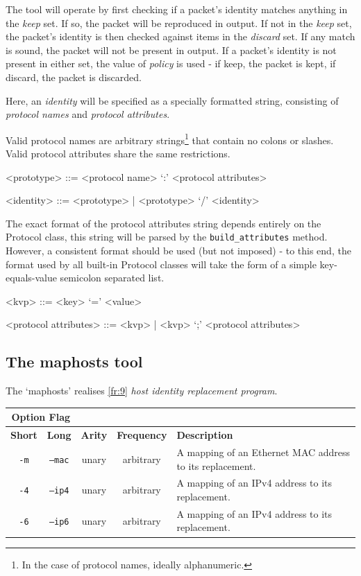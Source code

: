 \documentclass[10pt,a4paper,notitlepage]{report}
\begin{document}
The tool will operate by first checking if a packet's identity matches anything in the \emph{keep} set. If so, the packet will be reproduced in output. If not in the \emph{keep} set, the packet's identity is then checked against items in the \emph{discard} set. If any match is sound, the packet will not be present in output. If a packet's identity is not present in either set, the value of \emph{policy} is used - if keep, the packet is kept, if discard, the packet is discarded.

Here, an \emph{identity} will be specified as a specially formatted string, consisting of \emph{protocol names} and \emph{protocol attributes}.

Valid protocol names are arbitrary strings\footnote{In the case of protocol names, ideally alphanumeric.} that contain no colons or slashes. Valid protocol attributes share the same restrictions.

\begin{grammar}
<prototype> ::= <protocol name> `:' <protocol attributes>

<identity> ::= <prototype> | <prototype> `/' <identity>
\end{grammar}

The exact format of the protocol attributes string depends entirely on the Protocol class, this string will be parsed by the \texttt{build_attributes} method. However, a consistent format should be used (but not imposed) - to this end, the format used by all built-in Protocol classes will take the form of a simple key-equals-value semicolon separated list.

\begin{grammar}
<kvp> ::= <key> `=' <value>

<protocol attributes> ::= <kvp> | <kvp> `;' <protocol attributes>
\end{grammar}


\subsection{The maphosts tool}
The `maphosts' realises \ref{fr:9} \emph{host identity replacement program}.

\begin{tabularx}{\textwidth}{|c|c|c|c|X|}
\cline{1-2}
\multicolumn{2}{|c|}{\textbf{Option Flag}} & \multicolumn{3}{c}{}\\ \hline
\textbf{Short} & \textbf{Long} & \textbf{Arity} & \textbf{Frequency} & \textbf{Description} \\ \hline
\texttt{-m} & \texttt{--mac} & unary & arbitrary & A mapping of an Ethernet MAC address to its replacement.\\ \hline
\texttt{-4} & \texttt{--ip4} & unary & arbitrary & A mapping of an IPv4 address to its replacement.\\ \hline
\texttt{-6} & \texttt{--ip6} & unary & arbitrary & A mapping of an IPv4 address to its replacement.\\ \hline
\end{tabularx}
\end{document}
